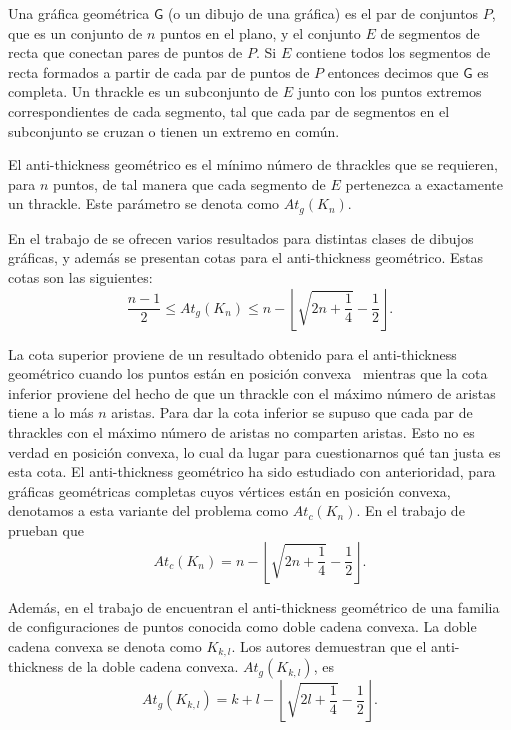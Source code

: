 Una gráfica geométrica $\mathsf{G}$ (o un dibujo de una gráfica) es el par de conjuntos $P$, que es un
conjunto de $n$ puntos en el plano, y el conjunto $E$ de segmentos de recta que conectan pares de puntos de
$P$. Si $E$ contiene todos los segmentos de recta formados a partir de cada par de puntos de $P$ entonces
decimos que $\mathsf{G}$ es completa. Un thrackle es un subconjunto de $E$ junto con los puntos extremos
correspondientes de cada segmento, tal que cada par de segmentos en el subconjunto se cruzan o tienen un
extremo en común.

El anti-thickness geométrico es el mínimo número de thrackles que se requieren, para $n$ puntos, de tal
manera que cada segmento de $E$ pertenezca a exactamente un thrackle. Este parámetro se denota como
$At_g(K_n)$.

En el trabajo de \cite{Dujmovic2017} se ofrecen varios resultados para distintas clases de dibujos
gráficas, y además  se presentan cotas para el anti-thickness geométrico. Estas cotas son las siguientes:
\[ \frac{n-1}{2} \leq At_g(K_n) \leq n - \left\lfloor\sqrt{2n + \frac{1}{4}}- \frac{1}{2}\right\rfloor.\]

La cota superior proviene de un resultado obtenido para el anti-thickness geométrico cuando los puntos están
en posición convexa~\cite{Fabila-Monroy2018} mientras que la cota inferior proviene del hecho de que un
thrackle con el máximo número de aristas tiene a lo más $n$ aristas. Para dar la cota inferior se supuso
que cada par de thrackles con el máximo número de aristas no comparten aristas. Esto no es verdad en
posición convexa, lo cual da lugar para cuestionarnos qué tan justa es esta cota. El anti-thickness
geométrico ha sido estudiado con anterioridad, para gráficas geométricas completas cuyos vértices están en
posición convexa, denotamos a esta variante del problema como $At_c(K_n)$. En el trabajo de
\cite{Fabila-Monroy2018} prueban que
\[At_c(K_n) = n - \left\lfloor\sqrt{2n + \frac{1}{4}}- \frac{1}{2}\right\rfloor.\]

Además, en el trabajo de \cite{Lomeli2018} encuentran el anti-thickness geométrico de una familia de
configuraciones de puntos conocida como doble cadena convexa. La doble cadena convexa se denota como
$K_{k,l}$. Los autores demuestran que el anti-thickness de la doble cadena convexa. $At_g(K_{k,l})$, es
\[ At_g(K_{k,l}) = k+l -\left\lfloor\sqrt{2l + \frac{1}{4}} -\frac{1}{2}\right\rfloor. \]

